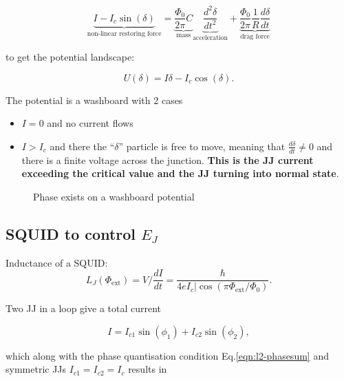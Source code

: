 \begin{equation}
  \underbrace{I - I_c\sin(\delta)}_{\text{non-linear restoring force}} = \underbrace{ \frac{\Phi_{0}}{2\pi}C}_{\text{mass}}\underbrace{\frac{d^2\delta}{dt^2}}_{\text{acceleration}} + \underbrace{\frac{\Phi_{0}}{2\pi}\frac{1}{R}\frac{d\delta}{dt}}_{\text{drag force}}
\end{equation}

\noindent to get the potential landscape:

\begin{equation}
  U(\delta) = I\delta - I_c\cos(\delta).
\end{equation}

\noindent The potential is a washboard with 2 cases
\begin{itemize}
\item $I=0$ and no current flows
\item $I>I_c$  and there the  ``$\delta$'' particle is free  to move,
  meaning  that $\frac{d\delta}{dt}  \ne  0$ and  there  is a  finite
  voltage  across  the  junction.   \textbf{This is  the  JJ  current
    exceeding  the critical  value  and the  JJ  turning into  normal
    state}.
\end{itemize}

\begin{figure}[h]
  \centering {}
  \caption{\small      Phase      exists     on      a      washboard
    potential\label{fig:jj_washboard}}
\end{figure}

\subsection{SQUID to control $ E_J $\cite{zhu2010}}
\begin{framed}\noindent
  Inductance of a SQUID:
  \begin{equation}\label{l2:squid:inductance}
    L_J(\Phi_\text{ext}) = V/\frac{dI}{dt} = \frac{\hbar}{4eI_c|\cos(\pi\Phi_\text{ext}/\Phi_0)}.
  \end{equation}
\end{framed}

Two JJ in a loop give a total current

    \begin{equation}
      I = I_{c1}\sin(\phi_1)+I_{c2}\sin(\phi_2),
    \end{equation}

    \noindent  which  along  with the  phase  quantisation  condition
    Eq.\eqref{eqn:l2-phasesum} and  symmetric JJs $I_{c1}=I_{c2}=I_c$
    results in

